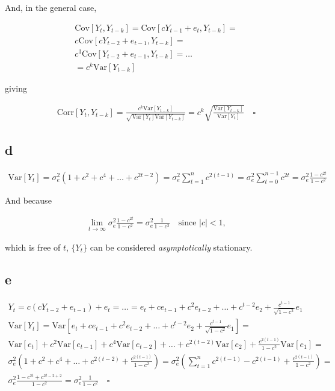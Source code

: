 \documentclass[]{book}
\theoremstyle{definition}
\theoremstyle{definition}
\theoremstyle{remark}
\begin{document}
And, in the general case,

\begin{gather*}
  \text{Cov}[Y_t, Y_{t-k}] = \text{Cov}[cY_{t-1}+e_t, Y_{t-k}] = \\
  c\text{Cov}[cY_{t-2} + e_{t-1}, Y_{t-k}] =\\
  c^3\text{Cov}[Y_{t-2} + e_{t-1}, Y_{t-k}] = \dots\\ = c^k\text{Var}[Y_{t-k}]
\end{gather*}

giving

\begin{gather*}
  \text{Corr}[Y_t, Y_{t-k}] = \frac{c^k\text{Var}[Y_{t-k}]}{\sqrt{\text{Var}[Y_t]\text{Var}[Y_{t-k}]}} =
    c^k \sqrt{\frac{\text{Var}[Y_{t-k}]}{\text{Var}[Y_t]}}\quad\square
\end{gather*}

\subsection*{d}\label{d-1}

\begin{gather*}
  \text{Var}[Y_t] = \sigma_e^2(1+c^2+c^4+\dots+c^{2t-2}) = \sigma_e^2\sum_{t=1}^{n}c^{2(t-1)}=\sigma_e^2 \sum_{t=0}^{n-1} c^{2t} =
    \sigma_e^2 \frac{1-c^{2t}}{1-c^2}
\end{gather*}

And because

\begin{gather*}
\lim_{t \rightarrow \infty} \sigma_e^2 \frac{1-c^{2t}}{1-c^2} = \sigma_e^2 \frac{1}{1-c^2}\quad\text{since }|c| < 1,
\end{gather*}

which is free of \(t\), \(\{Y_t\}\) can be considered
\emph{asymptotically} stationary.

\subsection*{e}\label{e}

\begin{gather*}
  Y_t = c(cY_{t-2} + e_{t-1}) + e_t = \dots = e_t+ce_{t-1} + c^2e_{t-2} + \dots + c^{t-2}e_2+ \frac{c^{t-1}}{\sqrt{1-c^2}}e_1\\
  \text{Var}[Y_t] = \text{Var}[e_t+ce_{t-1}+c^2e_{t-2}+\dots+c^{t-2}e_2+\frac{c^{t-1}}{\sqrt{1-c^2}}e_1] =\\
  \text{Var}[e_t] + c^2\text{Var}[e_{t-1}]+c^4 \text{Var}[e_{t-2}] + \dots + c^{2(t-2)}\text{Var}[e_2]+\frac{c^{2(t-1)}}{1-c^2}\text{Var}[e_1] =\\
  \sigma_e^2(1 + c^2 + c^4 + \dots + c^{2(t-2)} + \frac{c^{2(t-1)}}{1-c^2}) =\sigma_e^2\left( \sum_{t=1}^{n}c^{2(t-1)} - c^{2(t-1)} + \frac{c^{2(t-1)}}{1-c^2}\right)= \\
  \sigma_e^2 \frac{1-c^{2t}+c^{2t-2+2}}{1-c^2} = \sigma_e^2 \frac{1}{1-c^2} \quad \square
\end{gather*}
\end{document}
